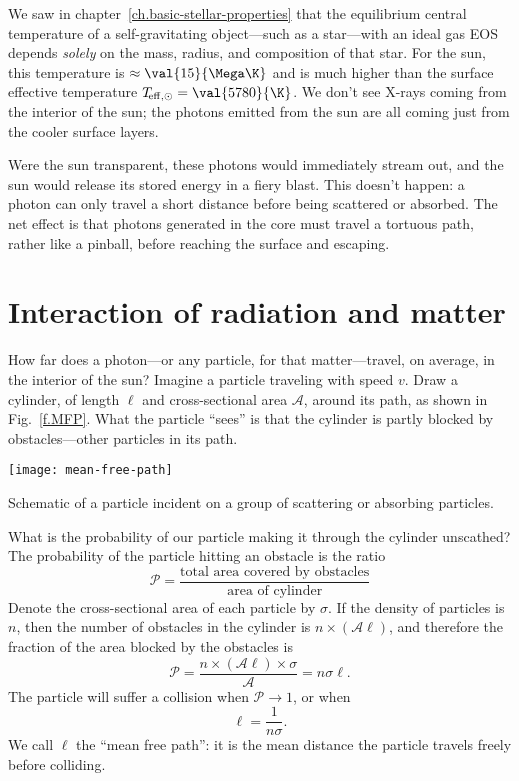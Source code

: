 
We saw in chapter~\ref{ch.basic-stellar-properties} that the equilibrium central temperature of a self-gravitating object---such as a star---with an ideal gas EOS depends \emph{solely} on the mass, radius, and composition of that star. For the sun, this temperature is $\approx \val{15}{\Mega\K}$ and is much higher than the surface effective temperature $T_{\!\mathrm{eff,\odot}} = \val{5780}{\K}$. We don't see X-rays coming from the interior of the sun; the photons emitted from the sun are all coming just from the cooler surface layers.

  Were the sun transparent, these photons would immediately stream out, and the sun would release its stored energy in a fiery blast.  This doesn't happen: a photon can only travel a short distance before being scattered or absorbed. The net effect is that photons generated in the core must travel a tortuous path, rather like a pinball, before reaching the surface and escaping.

\section{Interaction of radiation and matter}\label{s.interaction-radiation-matter}

How far does a photon---or any particle, for that matter---travel, on average, in the interior of the sun? Imagine a particle traveling with speed $v$.  Draw a cylinder, of length $\ell$ and cross-sectional area $\mathcal{A}$, around its path, as shown in Fig.~\ref{f.MFP}. What the particle ``sees'' is that the cylinder is partly blocked by obstacles---other particles in its path.
\begin{marginfigure}
    \texttt{[image: mean-free-path]}
    \caption[Schematic of mean free path]{\label{f.MFP} Schematic of a particle incident on a group of scattering or absorbing particles.}
\end{marginfigure}
What is the probability of our particle making it through the cylinder unscathed? The probability of the particle hitting an obstacle is the ratio
\[
    \mathcal{P} = \frac{\textrm{total area covered by obstacles}}{\textrm{area of cylinder}}
\]
Denote the cross-sectional area of each particle by $\sigma$. If the density of particles is $n$, then the number of obstacles in the cylinder is $n\times(\mathcal{A}\ell)$, and therefore the fraction of the area blocked by the obstacles is
\begin{equation}
    \mathcal{P} = \frac{n\times(\mathcal{A}\ell)\times\sigma}{\mathcal{A}} = n\sigma\ell.
\label{e.prob-MFP}
\end{equation}
The particle will suffer a collision when $\mathcal{P}\to 1$, or when
\begin{equation}\label{e.MFP}
    \ell = \frac{1}{n\sigma}.
\end{equation}
We call $\ell$ the ``mean free path'': it is the mean distance the particle travels freely before colliding.


